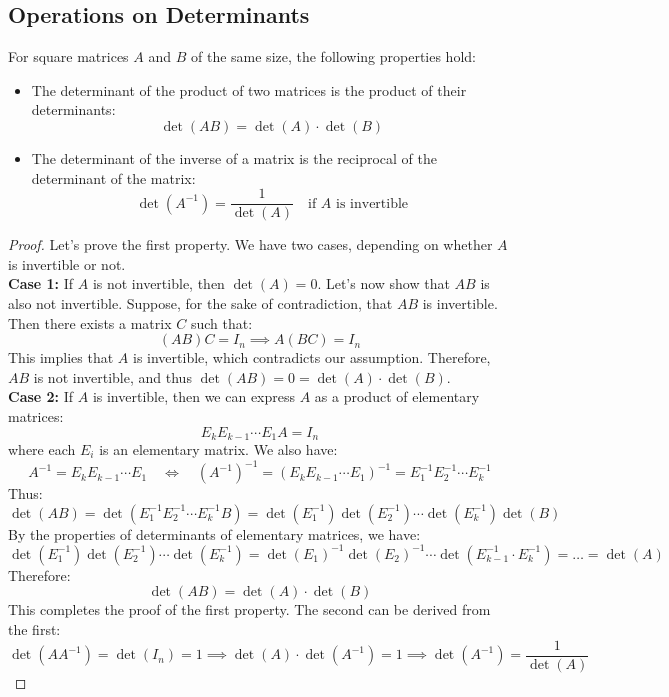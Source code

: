 \subsection{Operations on Determinants}
\begin{theorem}
    For square matrices \(A\) and \(B\) of the same size, the following properties hold:
    \begin{itemize}[itemsep=1pt,label=$\circ$]
        \item The determinant of the product of two matrices is the product of their determinants:
        \[
            \det(AB) = \det(A) \cdot \det(B)
        \]
        \item The determinant of the inverse of a matrix is the reciprocal of the determinant of the matrix:
        \[
            \det(A^{-1}) = \frac{1}{\det(A)} \quad \text{if } A \text{ is invertible}
        \]
    \end{itemize}
\end{theorem}
\begin{proof}
    Let's prove the first property. We have two cases, depending on whether \(A\) is invertible or not. \\
    \textbf{Case 1:} If \(A\) is not invertible, then \(\det(A) = 0\). Let's now show that $AB$ is also not invertible. Suppose, for the sake of contradiction, that \(AB\) is invertible. Then there exists a matrix \(C\) such that:
    \[
        (AB)C = I_n \implies A(BC) = I_n
    \]
    This implies that \(A\) is invertible, which contradicts our assumption. Therefore, \(AB\) is not invertible, and thus \(\det(AB) = 0 = \det(A) \cdot \det(B)\). \\
    \textbf{Case 2:} If \(A\) is invertible, then we can express \(A\) as a product of elementary matrices:
    \[
        E_k E_{k-1} \cdots E_1 A = I_n
    \]
    where each \(E_i\) is an elementary matrix. We also have:
    \[
        A^{-1} = E_k E_{k-1} \cdots E_1 \quad \Leftrightarrow \quad (A^{-1})^{-1} = (E_k E_{k-1} \cdots E_1)^{-1} = E_1^{-1} E_2^{-1} \cdots E_k^{-1}
    \]
    Thus:
    \[
        \det(AB) = \det(E_1^{-1} E_2^{-1} \cdots E_k^{-1} B) = \det(E_1^{-1}) \det(E_2^{-1}) \cdots \det(E_k^{-1}) \det(B)
    \]
    By the properties of determinants of elementary matrices, we have:
    \[
        \det(E_1^{-1}) \det(E_2^{-1}) \cdots \det(E_k^{-1}) = \det(E_1)^{-1} \det(E_2)^{-1} \cdots \det(E_{k-1}^{-1} \cdot E_k^{-1}) = \dots = \det(A)
    \]
    Therefore:
    \[
        \det(AB) = \det(A) \cdot \det(B)
    \]
    This completes the proof of the first property. The second can be derived from the first:
    \[
        \det(AA^{-1}) = \det(I_n) = 1 \implies \det(A) \cdot \det(A^{-1}) = 1 \implies \det(A^{-1}) = \frac{1}{\det(A)}
    \]
\end{proof}

